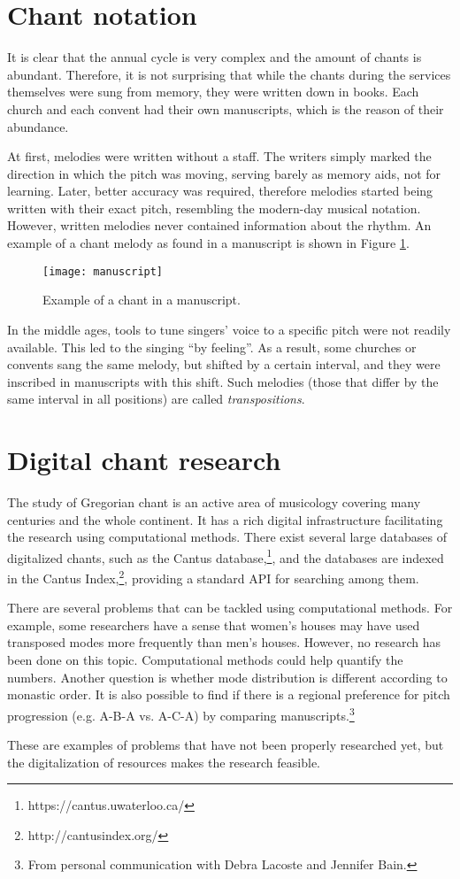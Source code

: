 \section{Chant notation}
\label{section:notation}

It is clear that the annual cycle is very complex and the amount of chants is abundant. Therefore, it is not surprising that while the chants during the
services themselves were sung from memory, they were written down in books. Each church and each convent had their own manuscripts, which is the
reason of their abundance.

At first, melodies were written without a staff. The writers simply marked the direction in which the pitch was moving, serving barely as memory aids,
not for learning. Later, better accuracy was required,
therefore melodies started being written with their exact pitch, resembling the modern-day musical notation. However, written melodies never contained
information about the rhythm. An example of a chant melody as found in a manuscript is shown in Figure \ref{fig:chant}.

\begin{figure}[h]
\centering
\texttt{[image: manuscript]}
\caption{Example of a chant in a manuscript. \cite[id~007553]{cantus_db}}
\label{fig:chant}
\end{figure}

In the middle ages, tools to tune singers' voice to a specific pitch were not readily available. This led to the singing ``by feeling''. As a result,
some churches or convents sang the same melody, but shifted by a certain interval, and they were inscribed in manuscripts with this shift. Such melodies
(those that differ by the same interval in all positions) are called \emph{transpositions}.

\section{Digital chant research}

The study of Gregorian chant is an active area of musicology covering many centuries and the whole continent. It has a rich digital infrastructure facilitating
the research using computational methods. There exist several large databases of digitalized chants, such as the Cantus database,\footnote{https://cantus.uwaterloo.ca/},
and the databases are indexed in the Cantus Index,\footnote{http://cantusindex.org/}, providing a standard API for searching among them.

There are several problems that can be tackled using computational methods. For example, some researchers have a sense that women's houses may have used
transposed modes more frequently than men's houses. However, no research has been done on this topic. Computational methods could help quantify the numbers.
Another question is whether mode distribution is different according to monastic order. It is also possible to find if there is a regional preference for
pitch progression (e.g. A-B-A vs. A-C-A) by comparing manuscripts.\footnote{From personal communication with Debra Lacoste and Jennifer Bain.}

These are examples of problems that have not been properly researched yet, but the digitalization of resources makes the research feasible.
